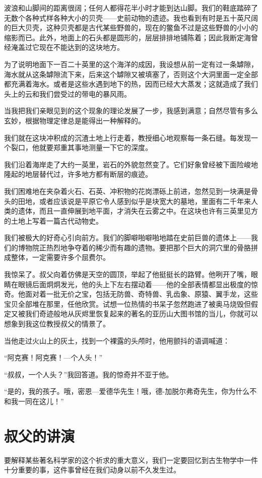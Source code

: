 \documentclass[10pt]{book}
\begin{document}
波浪和山脚间的距离很阔；任何人都得花半小时才能到达山脚。我们的鞋底踏碎了无数个各种式样各种大小的贝壳——史前动物的遗迹。我也看到有时是五十英尺阔的巨大贝壳，这种贝壳都是古代某些野兽的，现在的鳖鱼不过是这些野兽的小小的缩影而已。此外，地面上的石头都是圆形的，层层排排地铺陈着；因此我断定海曾经淹盖过它现在不能达到的这块地方。

为了说明地面下一百二十英里的这个海洋的成因，我设想从前一定有过一条罅隙，海水就从这条罅隙流下来，后来这个罅隙又被填塞了，否则这个大洞里面一定全部都充满着海水。或者是这些水遇到地下的热，因而已经大大蒸发；这就造成了我们头上的云和我们尝受过的带电的暴风雨。

当我把我们亲眼见到的这个现象的理论发展了一步，我感到满意；自然尽管有多么玄妙，根据物理定律总是能得出一种解释的。

我们就在这块冲积成的沉渣土地上行走着，教授细心地观察每一条石缝。每发现一个裂口，他就要郑重其事地测量一下它的深度。

我们沿着海岸走了大约一英里，岩石的外貌忽然变了。它们好象曾经被下面险峻地隆起的地层替代过，许多地方都有断层的痕迹。

我们困难地在夹杂着火石、石英、冲积物的花岗漂砾上前进，忽然见到一块满是骨头的田地，或者应该说是平原它令人感到似乎是块宽大的墓地，里面有二千年来人类的遗体，而且一直伸展到地平面，才消失在云雾之中。在这块也许有三英里见方的土地上写着一篇古代动物史。

我们被极大的好奇心引向前方。我们的脚噼啪噼啪地踏在史前巨兽的遗体上——我们的博物院正热烈地争夺着的稀少而有趣的遗物。要把那个巨大的洞穴里的骨胳拼成整体，一定需要许多个屈费尔。

我惊呆了。叔父向着仿佛是天空的圆顶，举起了他挺挺长的路臂。他咧开了嘴，眼睛在眼镜后面炯炯发光，他的头上下左右摆动着——他的全部表情都显出极度的惊奇。他面对着一批无价之宝，包括无防兽、奇特兽、乳齿象、原猿、翼手龙，这些宝贝全部堆在那里，任他欣赏。试想一位热情的书呆子忽然跑进了被奥马烧毁但假定又被我们奇迹般地从灰烬里恢复起来的著名的亚历山大图书馆的当儿，你就可以想象到我这位教授叔父的情景了。

当他走过火山上的灰土，找到一个裸露的头颅时，他用颤抖的语调喊道：

“阿克赛！阿克赛！—个人头！”

“叔叔，一个人头？”我回答道。我的惊奇并不亚于他。

“是的，我的孩子。哦，密恩—爱德华先生！哦，德-加脱尔弗奇先生，你为什么不和我一同在这儿！”
\chapter{叔父的讲演}
要解释某些著名科学家的这个祈求的重大意义，我们一定要回忆到古生物学中一件十分重要的事，这件事曾经在我们动身以前不久发生过。
\end{document}
